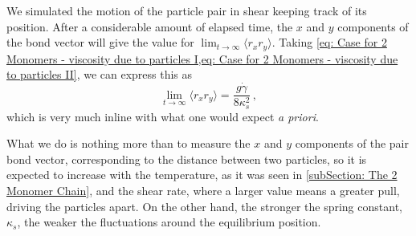 \documentclass[../../main.tex]{subfiles}
\begin{document}
    We simulated the motion of the particle pair in shear keeping track of its position. After a considerable amount of elapsed time, the $x$ and $y$ components of the bond vector will give the value for $\displaystyle\lim_{t \rightarrow \infty} \langle r_x r_y \rangle$. Taking \cref{eq: Case for 2 Monomers - viscosity due to particles I,eq: Case for 2 Monomers - viscosity due to particles II}, we can express this as
        \begin{equation}\label{eq: Case for 2 Monomers - Viscoelasticity - plot equation}
            \lim_{t \rightarrow \infty} \langle r_x r_y \rangle = \frac{g\Dot{\gamma}}{8\kappa_s^2} \,,
        \end{equation}
    which is very much inline with what one would expect \textit{a priori}. 
    
    What we do is nothing more than to measure the $x$ and $y$ components of the pair bond vector, corresponding to the distance between two particles, so it is expected to increase with the temperature, as it was seen in \cref{subSection: The 2 Monomer Chain}, and the shear rate, where a larger value means a greater pull, driving the particles apart. On the other hand, the stronger the spring constant, $\kappa_s$, the weaker the fluctuations around the equilibrium position.

    
\end{document}
